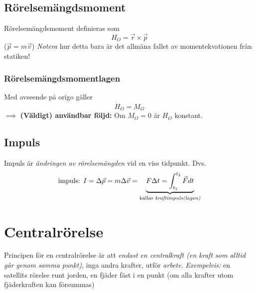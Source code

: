 \documentclass{article}
\newenvironment{ankiflashcard}[1]{}{}
\begin{document}
\begin{paracol}{2}
\begin{ankiflashcard}{Definiera rörelsemängdsmoment}
    
\subsection{Rörelsemängdsmoment}
Rörelsemängdsmoment definieras som
$$
H_O = \vec r \times \vec p
$$
($\vec p = m \vec v$)
\textit{Notera} hur detta bara är det allmäna fallet av momentekvationen från statiken!
\end{ankiflashcard}


\begin{ankiflashcard}{Definiera rörelsemängdsmomentlagen.}
\subsubsection{Rörelsemängdsmomentlagen}
Med avseende på origo gäller
$$
\dot H_O = M_O
$$
$\implies$ \textbf{(Väldigt) användbar följd:} Om $M_O=0$ är $H_O$ konstant.
\end{ankiflashcard}


\begin{ankiflashcard}{Definiera vad impuls är. Definiera även kraftimpulslagen.}
    
\subsection{Impuls}
Impuls är \textit{ändringen av rörelsemängden} vid en viss tidpunkt. Dvs.
$$\text{impuls: } I = \Delta \vec p = m \Delta \vec v = \underbrace{F\Delta t =  \int_{t_1}^{t_2} \vec F dt}_{\text{kallas \textit{kraftimpuls(lagen)}}}$$
\end{ankiflashcard}

\begin{ankiflashcard}{Definiera centralrörelse och dess kännetecken.}
    \section{Centralrörelse}
  
    Principen för en centralrörelse är att \textit{endast en centralkraft (en kraft som alltid går genom samma punkt)}, inga andra krafter, utför \textit{arbete}. \textit{Exempelvis:} en satellits rörelse runt jorden, en fjäder fäst i en punkt (om alla krafter utom fjäderkraften kan försummas)


\end{ankiflashcard}
\end{paracol}
\end{document}
